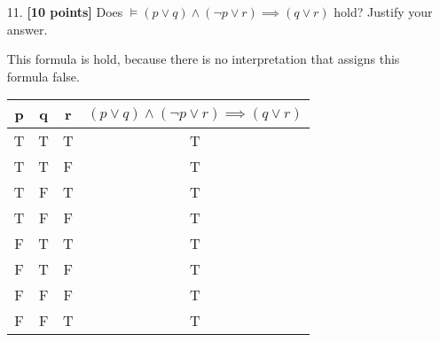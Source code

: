 \documentclass{article}
\begin{document}
\begin{enumerate}
\item[11.] \textbf{[10 points]} Does
  $\models (p \lor q) \land (\neg p \lor r) \implies (q \lor r)$ hold?
  Justify your answer.
   
   \begin{answer}
  This formula is hold, because there is no interpretation that assigns this formula false.\\
  \begin{tabular}{|c|c|c|c|}\hline
   p & q & r & $ (p \lor q) \land (\neg p \lor r) \implies (q \lor r)$ \\ \hline
   T & T & T & T \\\hline
   T & T & F & T \\\hline
   T & F & T & T \\\hline
   T & F & F & T \\\hline
   F & T & T & T \\\hline
   F & T & F & T \\\hline
   F & F & F & T \\\hline
   F & F & T & T \\\hline
  \end{tabular}
  \end{answer}
  
\end{enumerate}
\end{document}
